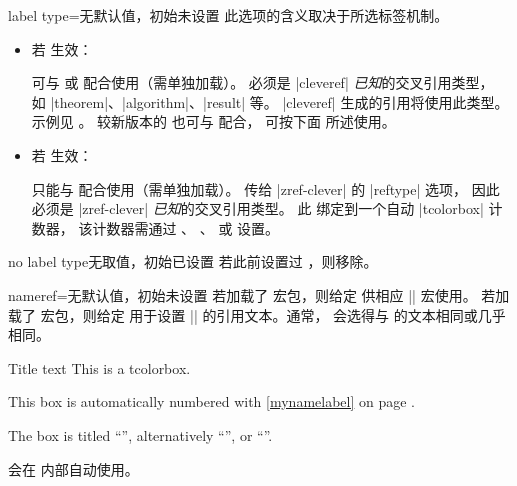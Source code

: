 \begin{docTcbKey}[][doc updated=2024-10-22]{label type}{=}{无默认值，初始未设置}
此选项的含义取决于所选标签机制。
\begin{itemize}
\item 若  生效：\par
   可与  \cite{cubitt:2018a}
  或  \cite{barros:zref-clever} 配合使用（需单独加载）。
   必须是 |cleveref| \emph{已知}的交叉引用类型，
  如 |theorem|、|algorithm|、|result| 等。
  |cleveref| 生成的引用将使用此类型。示例见 。
  较新版本的  也可与  配合，
   可按下面  所述使用。
\item 若  生效：\par
   只能与  \cite{barros:zref-clever}
  配合使用（需单独加载）。
   传给 |zref-clever| 的 |reftype| 选项，
  因此必须是 |zref-clever| \emph{已知}的交叉引用类型。
  此  绑定到一个自动 |tcolorbox| 计数器，
  该计数器需通过 、
  、 或
   设置。
\end{itemize}
\end{docTcbKey}


\begin{docTcbKey}[][doc updated=2023-02-09]{no label type}{}{无取值，初始已设置}
若此前设置过 ，则移除。
\end{docTcbKey}


\clearpage
\begin{docTcbKey}[][doc new and updated={2016-06-22}{2023-02-08}]{nameref}{=}{无默认值，初始未设置}
若加载了  宏包，则给定  供相应 |\nameref| 宏使用。
若加载了  宏包，则给定  用于设置
|\ztitleref| 的引用文本。通常， 会选得与
 的文本相同或几乎相同。


\begin{dispExample}
\begin{pabox}[label={mynamelabel},nameref={Title or anything else}]{Title text}
This is a tcolorbox.
\end{pabox}
This box is automatically numbered with \ref{mynamelabel} on page
\pageref{mynamelabel}.

The box is titled \enquote{},
alternatively \enquote{},
or \enquote{}.
\end{dispExample}

\begin{marker}
 会在  内部自动使用。
\end{marker}

\end{docTcbKey}


